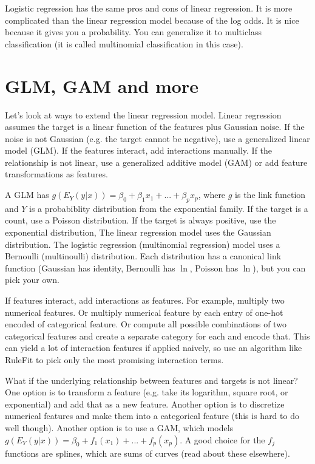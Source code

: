 \documentclass[a4paper]{article}
\begin{document}
Logistic regression has the same pros and cons of linear regression. It is
more complicated than the linear regression model because of the log odds.
It is nice because it gives you a probability. You can generalize it to
multiclass classification (it is called multinomial classification in this
case).

\section{GLM, GAM and more}
Let's look at ways to extend the linear regression model. Linear regression
assumes the target is a linear function of the features plus Gaussian noise. If
the noise is not Gaussian (e.g. the target cannot be negative), use a
generalized linear model (GLM). If the features interact, add interactions
manually. If the relationship is not linear, use a generalized additive model
(GAM) or add feature transformations as features.

A GLM has $g(E_Y(y|x)) = \beta_0 + \beta_1 x_1 + ... + \beta_p x_p$, where
$g$ is the link function and $Y$ is a probabiblity distribution from the
exponential family. If the target is a count, use a Poisson distribution. If
the target is always positive, use the exponential distribution, The linear
regression model uses the Gaussian distribution. The logistic regression
(multinomial regression) model uses a Bernoulli (multinoulli) distribution. Each
distribution has a canonical link function (Gaussian has identity,
Bernoulli has $\ln$, Poisson has $\ln$), but you can pick your own.

If features interact, add interactions as features. For example, multiply two
numerical features. Or multiply numerical feature by each entry of one-hot
encoded of categorical feature. Or compute all possible combinations of two
categorical features and create a separate category for each and encode that.
This can yield a lot of interaction features if applied naively, so use an
algorithm like RuleFit to pick only the most promising interaction terms.

What if the underlying relationship between features and targets is not
linear? One option is to transform a feature (e.g. take its logarithm, square
root, or exponential) and add that as a new feature. Another option is to
discretize numerical features and make them into a categorical feature (this
is hard to do well though). Another option is to use a GAM, which models
$g(E_Y(y|x)) = \beta_0 + f_1(x_1) + ... + f_p(x_p)$. A good choice for the $f_j$
functions are splines, which are sums of curves (read about these elsewhere).
\end{document}
